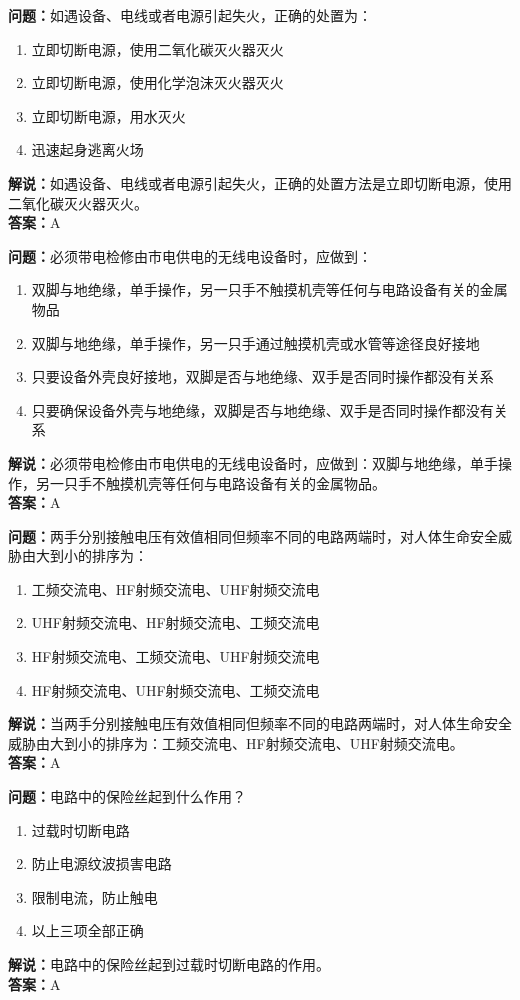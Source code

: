 \documentclass{ctexbook}%
\begin{document}
\textbf{问题：}如遇设备、电线或者电源引起失火，正确的处置为：
\begin{enumerate}[label=\Alph*), leftmargin=3em]
\item 立即切断电源，使用二氧化碳灭火器灭火
\item 立即切断电源，使用化学泡沫灭火器灭火
\item 立即切断电源，用水灭火
\item 迅速起身逃离火场
\end{enumerate}
\textbf{解说：}如遇设备、电线或者电源引起失火，正确的处置方法是立即切断电源，使用二氧化碳灭火器灭火。\\
\textbf{答案：}A

\textbf{问题：}必须带电检修由市电供电的无线电设备时，应做到：
\begin{enumerate}[label=\Alph*), leftmargin=3em]
\item 双脚与地绝缘，单手操作，另一只手不触摸机壳等任何与电路设备有关的金属物品
\item 双脚与地绝缘，单手操作，另一只手通过触摸机壳或水管等途径良好接地
\item 只要设备外壳良好接地，双脚是否与地绝缘、双手是否同时操作都没有关系
\item 只要确保设备外壳与地绝缘，双脚是否与地绝缘、双手是否同时操作都没有关系
\end{enumerate}
\textbf{解说：}必须带电检修由市电供电的无线电设备时，应做到：双脚与地绝缘，单手操作，另一只手不触摸机壳等任何与电路设备有关的金属物品。\\
\textbf{答案：}A

\textbf{问题：}两手分别接触电压有效值相同但频率不同的电路两端时，对人体生命安全威胁由大到小的排序为：
\begin{enumerate}[label=\Alph*), leftmargin=3em]
\item 工频交流电、HF射频交流电、UHF射频交流电
\item UHF射频交流电、HF射频交流电、工频交流电
\item HF射频交流电、工频交流电、UHF射频交流电
\item HF射频交流电、UHF射频交流电、工频交流电
\end{enumerate}
\textbf{解说：}当两手分别接触电压有效值相同但频率不同的电路两端时，对人体生命安全威胁由大到小的排序为：工频交流电、HF射频交流电、UHF射频交流电。\\
\textbf{答案：}A

\textbf{问题：}电路中的保险丝起到什么作用？
\begin{enumerate}[label=\Alph*), leftmargin=3em]
\item 过载时切断电路
\item 防止电源纹波损害电路
\item 限制电流，防止触电
\item 以上三项全部正确
\end{enumerate}
\textbf{解说：}电路中的保险丝起到过载时切断电路的作用。\\
\textbf{答案：}A
\end{document}
